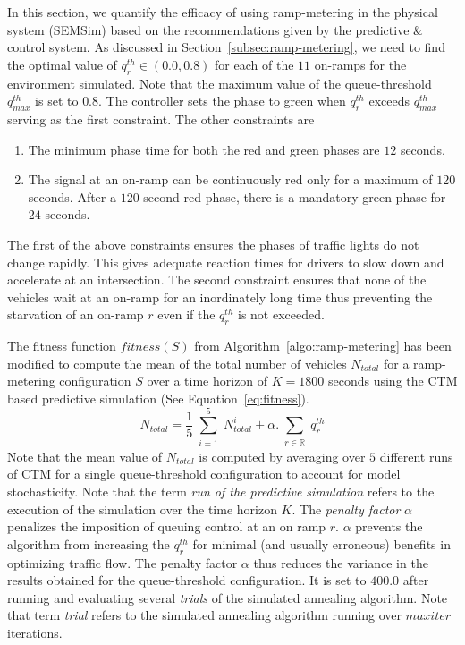 \documentclass{wscpaperproc}
\theoremstyle{wsc}
\begin{document}
In this section, we quantify the efficacy of using ramp-metering in the physical system (SEMSim) based on the recommendations given by the predictive \& control system. As discussed in Section~\ref{subsec:ramp-metering}, we need to find the optimal value of $q^{th}_r \in (0.0,0.8)$ for each of the $11$ on-ramps for the environment simulated. Note that the maximum value of the queue-threshold $q^{th}_{max}$ is set to $0.8$. The controller sets the phase to green when $q^{th}_r$ exceeds $q^{th}_{max}$ serving as the first constraint. The other constraints are
\begin{enumerate}
\item The minimum phase time for both the red and green phases are $12$ seconds.
\item The signal at an on-ramp can be continuously red only for a maximum of $120$ seconds. After a $120$ second red phase, there is a mandatory green phase for $24$ seconds.
\end{enumerate}
The first of the above constraints ensures the phases of traffic lights do not change rapidly. This gives adequate reaction times for drivers to slow down and accelerate at an intersection. The second constraint ensures that none of the vehicles wait at an on-ramp for an inordinately long time thus preventing the starvation of an on-ramp $r$ even if the $q^{th}_r$ is not exceeded.

The fitness function $fitness(S)$ from Algorithm~\ref{algo:ramp-metering} has been modified to compute the mean of the total number of vehicles $N_{total}$ for a ramp-metering configuration $S$ over a time horizon of $K=1800$ seconds using the CTM based predictive simulation (See Equation~\ref{eq:fitness}). 
\begin{equation}
\label{eq:fitness}
N_{total}= \frac{1}{5}\sum\limits_{\substack{i=1}}^{5}N^{i}_{total} + \alpha.\sum\limits_{\substack{r\in\mathbb{R}}}q^{th}_{r}
\end{equation}
Note that the mean value of $N_{total}$ is computed by averaging over $5$ different runs of CTM for a single queue-threshold configuration to account for model stochasticity. Note that the term {\it run of the predictive simulation} refers to the execution of the simulation over the time horizon $K$. The {\it penalty factor} $\alpha$  penalizes the imposition of queuing control at an on ramp $r$. $\alpha$ prevents the algorithm from increasing the $q^{th}_r$ for minimal (and usually erroneous) benefits in  optimizing traffic flow. The penalty factor $\alpha$ thus reduces the variance in the results obtained for the queue-threshold configuration. It is set to $400.0$ after running and evaluating several {\it trials} of the simulated annealing algorithm. Note that term {\it trial} refers to the simulated annealing algorithm running over $maxiter$ iterations.
\end{document}

